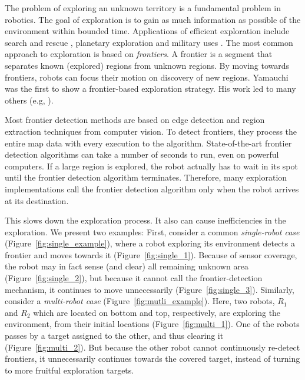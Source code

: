 The problem of exploring an unknown territory is a fundamental problem in
robotics. The goal of exploration is to gain as much information as possible
of the environment within bounded time. 
Applications of efficient exploration include search and rescue \cite{Kitano99robocuprescue}, planetary exploration \cite{apostolopoulos2001robotic} and military uses \cite{hougen2000miniature}.
The most common approach to exploration is based on \emph{frontiers}. A frontier
is a segment that separates known (explored) regions from unknown regions. By
moving towards frontiers, robots can focus their motion on discovery of new
regions. Yamauchi
\cite{yamauchi_frontier-based_1997,yamauchi_frontier-based_1998} was the first
to show a frontier-based exploration strategy. His work led to many
others (e.g,
\cite{burgard05tro,lau_behavioural_2003,sawhney_fast_2009,burgard_collaborative_2000}).

Most frontier detection methods are based on edge detection and region
extraction techniques from computer vision. To detect frontiers, they
process the entire map data with every execution to the algorithm.
State-of-the-art frontier detection algorithms can take a number of seconds to run, even on powerful
computers. If a large region is explored, the robot actually has to wait in its
spot until the frontier detection algorithm terminates. Therefore, many
exploration implementations call the frontier detection algorithm only when the
robot arrives at its destination. 
 
This slows down the exploration process. It also can cause inefficiencies in the
exploration.
We present two examples:
First, consider a common \textit{single-robot case} (Figure~\ref{fig:single_example}),
where a robot exploring its environment detects a frontier and moves towards it (Figure~\ref{fig:single_1}).
Because of sensor coverage, the robot may in fact sense (and clear) all remaining unknown
area (Figure~\ref{fig:single_2}), but because it cannot call the
frontier-detection mechanism, it continues to move unnecessarily
(Figure~\ref{fig:single_3}). Similarly, consider a \textit{multi-robot case}
(Figure~\ref{fig:mutli_example}). Here, two robots,
 $R_1$ and $R_2$ which are located on bottom and top, respectively, 
are exploring the environment, from their initial locations (Figure~\ref{fig:multi_1}). 
One of the robots passes by a target assigned to the other, and thus clearing it
(Figure~\ref{fig:multi_2}).
But because the other robot cannot continuously re-detect frontiers, it unnecessarily continues
towards the covered target, instead of turning to more fruitful exploration targets.

